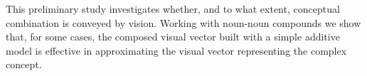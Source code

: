 This preliminary study investigates whether, and to what extent, conceptual combination is conveyed by vision. Working with noun-noun compounds we show that, for some cases, the composed visual vector built with a simple additive model is effective in approximating the visual vector representing the complex concept.
